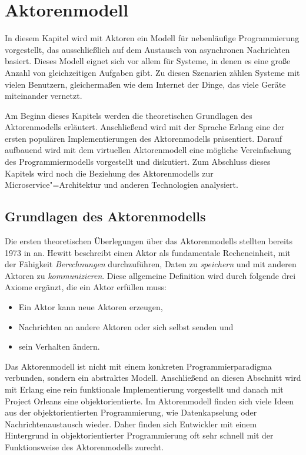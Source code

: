 \chapter{Aktorenmodell}

In diesem Kapitel wird mit Aktoren ein Modell für nebenläufige Programmierung vorgestellt, das ausschließlich auf dem Austausch von asynchronen Nachrichten basiert. Dieses Modell eignet sich vor allem für Systeme, in denen es eine große Anzahl von gleichzeitigen Aufgaben gibt. Zu diesen Szenarien zählen Systeme mit vielen Benutzern, gleichermaßen wie dem Internet der Dinge, das viele  Geräte miteinander vernetzt.

Am Beginn dieses Kapitels werden die theoretischen Grundlagen des Aktorenmodells erläutert. Anschließend wird mit der Sprache Erlang eine der ersten populären Implementierungen des Aktorenmodells präsentiert. Darauf aufbauend wird mit dem virtuellen Aktorenmodell eine mögliche Vereinfachung des Programmiermodells vorgestellt und diskutiert. Zum Abschluss dieses Kapitels wird noch die Beziehung des Aktorenmodells zur Microservice"=Architektur und anderen Technologien analysiert.

\section{Grundlagen des Aktorenmodells}
\label{sec:actor-model}

Die ersten theoretischen Überlegungen über das Aktorenmodells stellten \citeauthor{Hewitt:1973:UMA:1624775.1624804} bereits 1973 in \cite{Hewitt:1973:UMA:1624775.1624804} an. Hewitt beschreibt einen Aktor als fundamentale Recheneinheit, mit der Fähigkeit  \textit{Berechnungen} durchzuführen, Daten zu \textit{speichern} und mit anderen Aktoren zu \textit{kommunizieren}. Diese allgemeine Definition wird durch folgende drei Axiome ergänzt, die ein Aktor erfüllen muss:

\begin{itemize}
	\item Ein Aktor kann neue Aktoren erzeugen,
	\item Nachrichten an andere Aktoren oder sich selbst senden und
	\item sein Verhalten ändern.
\end{itemize}

\noindent
Das Aktorenmodell ist nicht mit einem konkreten Programmierparadigma verbunden, sondern ein abstraktes Modell. Anschließend an diesen Abschnitt wird mit Erlang eine rein funktionale Implementierung vorgestellt und danach mit Project Orleans eine objektorientierte. Im Aktorenmodell finden sich viele Ideen aus der objektorientierten Programmierung, wie \zB Datenkapselung oder Nachrichtenaustausch wieder. Daher finden sich Entwickler mit einem Hintergrund in objektorientierter Programmierung oft sehr schnell mit der Funktionsweise des Aktorenmodells zurecht.


